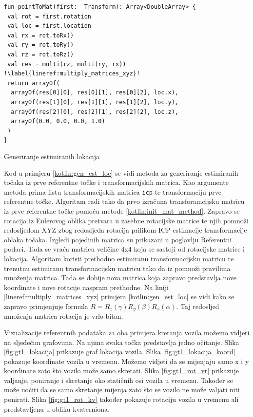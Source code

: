 \begin{listing}[h!]
  \begin{verbatim}
fun pointToMat(first:  Transform): Array<DoubleArray> {
 val rot = first.rotation
 val loc = first.location
 val rx = rot.toRx()
 val ry = rot.toRy()
 val rz = rot.toRz()
 val res = multi(rz, multi(ry, rx)) !\label{lineref:multiply_matrices_xyz}!
 return arrayOf(
  arrayOf(res[0][0], res[0][1], res[0][2], loc.x),
  arrayOf(res[1][0], res[1][1], res[1][2], loc.y),
  arrayOf(res[2][0], res[2][1], res[2][2], loc.z),
  arrayOf(0.0, 0.0, 0.0, 1.0)
 )
}
  \end{verbatim}
  \caption{Generiranje estimiranih lokacija}
  \label{kotlin:init_mat_method}
\end{listing}

Kod u primjeru \ref{kotlin:gen_est_loc} se vidi metoda za generiranje estimiranih točaka iz prve referentne točke i transformacijskih matrica. Kao argumente metoda prima listu transformacijskih matrica \texttt{icp} te transformaciju prve referentne točke. Algoritam radi tako da prvo izračuna transforamcijsku matricu iz prve referentne točke pomoću metode \ref{kotlin:init_mat_method}. Zapravo se rotacija iz Eulerovog oblika pretvara u zasebne rotacijske matrice te njih pomnoži redosljedom XYZ zbog redosljeda rotacija prilikom ICP estimacije transformacije oblaka točaka. Izgledi pojedinih matrica su prikazani u poglavlju Referentni podaci. Tada se vraća matricu veličine 4x4 koja se sastoji od rotacijske matrice i lokacija. Algoritam koristi prethodno estimiranu transformacijsku matricu te trenutnu estimiranu transformacijsku matricu tako da iz pomnoži pravilima množenja matrica. Tada se dobije nova matrica koja zapravo predstavlja nove koordinate i nove rotacije naspram prethodne. Na liniji \ref{lineref:multiply_matrices_xyz} primjera \ref{kotlin:gen_est_loc} se vidi kako se zapravo primjenjuje formula $R = R_{z}(\gamma)R_{y}(\beta)R_{x}(\alpha)$. Taj redosljed množenja matrica rotacija je vrlo bitan.

Vizualizacije referentnih podataka za oba primjera kretanja vozila možemo vidjeti na sljedećim grafovima. Na njima svaka točka predstavlja jedno očitanje. Slika \ref{fig:gt1_lokacija} prikazuje graf lokacija vozila. Slika \ref{fig:gt1_lokacija_koord} pokazuje koordinate vozila u vremenu. Možemo vidjeti da se mijenjaju samo x i y koordinate zato što vozilo može samo skretati. Slika \ref{fig:gt1_rot_vr} prikazuje valjanje, poniranje i skretanje oko statičnih osi vozila u vremenu. Također se može uoćiti da se samo skretanje mijenja zato što se vozilo ne može valjati niti ponirati. Slika \ref{fig:gt1_rot_kv} također pokazuje rotaciju vozila u vremenu ali predstavljenu u obliku kvaterniona.
\pagebreak
